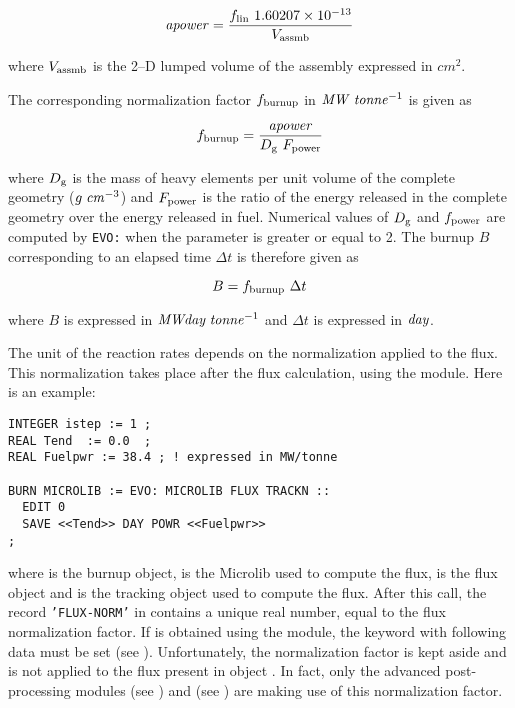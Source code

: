 \begin{equation}
{\it apower}={f_{\rm lin} \ 1.60207 \times 10^{-13} \over V_{\rm assmb}}
\label{eq:eq1}
\end{equation}

\noindent where $V_{\rm assmb}$ is the 2--D lumped volume of the assembly expressed in $cm^2$.

\vskip 0.2cm

The corresponding normalization factor $f_{\rm burnup}$ in
${\it MW}\;{\it tonne}^{-1}$ is given as

\begin{equation}
f_{\rm burnup}={ {\it apower} \over D_{\rm g} \ F_{\rm power}}
\label{eq:eq2}
\end{equation}

\noindent where $D_{\rm g}$ is the mass of heavy elements per unit volume
of the complete geometry ($g\; {\it cm}^{-3}$) and $F_{\rm power}$ is the
ratio of the energy released in the complete geometry over the energy
released in fuel. Numerical values of $D_{\rm g}$ and $f_{\rm power}$ are
computed by {\tt EVO:} when the parameter  is greater or
equal to 2. The burnup $B$ corresponding to an elapsed time $\Delta t$ is
therefore given as

\begin{equation}
B=f_{\rm burnup} \ \Delta t
\label{eq:eq3}
\end{equation}

\noindent where $B$ is expressed in ${\it MWday}\;{\it tonne}^{-1}$ and $\Delta t$
is expressed in ${\it day}$.

\vskip 0.2cm

The unit of the reaction rates depends on the normalization applied to the flux. This normalization
takes place after the flux calculation, using the  module. Here is an example:

\begin{verbatim}
INTEGER istep := 1 ;
REAL Tend  := 0.0  ;
REAL Fuelpwr := 38.4 ; ! expressed in MW/tonne

BURN MICROLIB := EVO: MICROLIB FLUX TRACKN ::
  EDIT 0
  SAVE <<Tend>> DAY POWR <<Fuelpwr>>
;
\end{verbatim}

\noindent where  is the burnup object,  is the Microlib used to compute the flux,  is the flux
object and  is the tracking object used to compute the flux. After this call, the record
{\tt 'FLUX-NORM'} in  contains a unique real number, equal to the flux normalization factor. If  is
obtained using the  module, the  keyword with following data must be set (see ).
Unfortunately, the normalization factor is kept aside and is not applied to the flux present in object . In
fact, only the advanced post-processing modules  (see ) and  (see )
are making use of this normalization factor.

\eject
